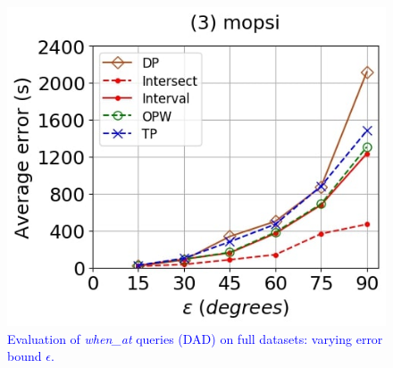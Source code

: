 {\begin{figure}[tb!]
	\includegraphics[scale = 0.250]{Figures/Exp-when-DAD-error-epsilon-mopsi.jpg}
	\vspace{-1ex}
	\caption{\small \textcolor{blue}{Evaluation of \emph{when\_at} queries (DAD) on full datasets: varying error bound $\epsilon$.}}
	\label{fig:query-when-dad-epsilon}
	\vspace{-1.0ex}
\end{figure}



}
